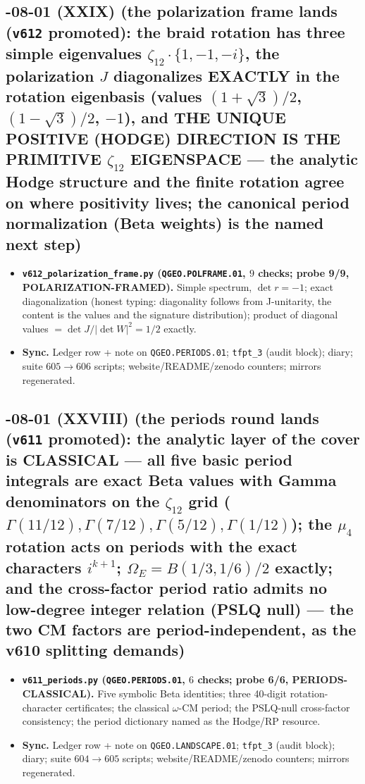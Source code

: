 \subsection*{-08-01 (XXIX) (the polarization frame lands (\texttt{v612} promoted): the braid rotation has three simple eigenvalues $\zeta_{12}\cdot\{1,-1,-i\}$, the polarization $J$ diagonalizes EXACTLY in the rotation eigenbasis (values $(1+\sqrt3)/2$, $(1-\sqrt3)/2$, $-1$), and THE UNIQUE POSITIVE (HODGE) DIRECTION IS THE PRIMITIVE $\zeta_{12}$ EIGENSPACE --- the analytic Hodge structure and the finite rotation agree on where positivity lives; the canonical period normalization (Beta weights) is the named next step)}
\begin{itemize}[leftmargin=1.5em]
\item \textbf{\texttt{v612\_polarization\_frame.py} (\texttt{QGEO.POLFRAME.01}, $9$ checks;
probe 9/9, POLARIZATION-FRAMED).} Simple spectrum, $\det r=-1$; exact diagonalization
(honest typing: diagonality follows from J-unitarity, the content is the values and the
signature distribution); product of diagonal values $=\det J/|\det W|^2=1/2$ exactly.
\item \textbf{Sync.} Ledger row + note on \texttt{QGEO.PERIODS.01}; \texttt{tfpt\_3} (audit
block); diary; suite $605\to606$ scripts; website/README/zenodo counters; mirrors
regenerated.
\end{itemize}

\subsection*{-08-01 (XXVIII) (the periods round lands (\texttt{v611} promoted): the analytic layer of the cover is CLASSICAL --- all five basic period integrals are exact Beta values with Gamma denominators on the $\zeta_{12}$ grid ($\Gamma(11/12),\Gamma(7/12),\Gamma(5/12),\Gamma(1/12)$); the $\mu_4$ rotation acts on periods with the exact characters $i^{k+1}$; $\Omega_E=B(1/3,1/6)/2$ exactly; and the cross-factor period ratio admits no low-degree integer relation (PSLQ null) --- the two CM factors are period-independent, as the v610 splitting demands)}
\begin{itemize}[leftmargin=1.5em]
\item \textbf{\texttt{v611\_periods.py} (\texttt{QGEO.PERIODS.01}, $6$ checks; probe 6/6,
PERIODS-CLASSICAL).} Five symbolic Beta identities; three 40-digit rotation-character
certificates; the classical $\omega$-CM period; the PSLQ-null cross-factor consistency;
the period dictionary named as the Hodge/RP resource.
\item \textbf{Sync.} Ledger row + note on \texttt{QGEO.LANDSCAPE.01}; \texttt{tfpt\_3}
(audit block); diary; suite $604\to605$ scripts; website/README/zenodo counters; mirrors
regenerated.
\end{itemize}

